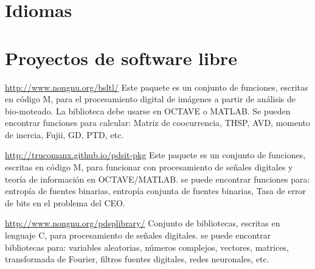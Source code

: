 \documentclass[11pt,a4paper,sans]{moderncv} %
\begin{document}



\section{Idiomas}


 
\section{Proyectos de software libre}

			{\url{http://www.nongnu.org/bsltl/}}
			{}{}
			{Este paquete es un conjunto de funciones, escritas en código M, para el
 procesamiento digital de imágenes a partir de análisis de bio-moteado.
 La biblioteca debe usarse en OCTAVE o MATLAB.
 Se pueden encontrar funciones para calcular:
 Matriz de coocurrencia, THSP, AVD, momento de inercia,
 Fujii, GD, PTD, etc.}

			{\url{http://trucomanx.github.io/pdsit-pkg}}
			{}{}
			{Este paquete es un conjunto de funciones, escritas en código M, para funcionar
 con procesamiento de señales digitales y teoría de
 información en OCTAVE/MATLAB. se puede encontrar
 funciones para: entropía de fuentes binarias,
 entropía conjunta de fuentes binarias,
 Tasa de error de bits en el problema del CEO. }
			
			

			{\url{http://www.nongnu.org/pdsplibrary/}}
			{}{}
			{Conjunto de bibliotecas, escritas en lenguaje C, para
 procesamiento de señales digitales. se puede encontrar
 bibliotecas para: variables aleatorias, números complejos,
 vectores, matrices, transformada de Fourier, filtros
 fuentes digitales, redes neuronales, etc.}
\end{document}
